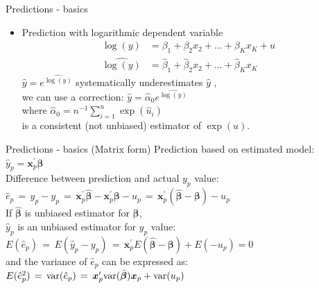 \documentclass{beamer}
\begin{document}

\begin{frame}{Predictions - basics}
\begin{itemize}
\item Prediction with logarithmic dependent variable
\begin{align}\nonumber
\log(y) &= \beta_1 + \beta_2 x_2 + \dots + \beta_K x_K + u\\\nonumber
\widehat{\log(y)} &= \hat{\beta}_1 + \hat{\beta}_2 x_2 + \dots + \hat{\beta}_K x_K 
\end{align}
$\hat{y} =e^{\widehat{\log(y)}}$ systematically underestimates $\hat{y}$ , \\
\vspace{0.3cm}
we can use a correction: $\hat{y}=\widehat{\alpha}_0 e^{\widehat{\log(y)}}$ \\
\vspace{0.3cm}
where $\widehat{\alpha}_0 = n^{-1} \sum_{i=1}^n \exp(\hat{u}_i)$ \\
\vspace{0.3cm}
is a consistent (not unbiased) estimator of $\exp{(u)}$.
\end{itemize}
\end{frame}

\begin{frame}{Predictions - basics (Matrix form)}
Prediction based on estimated model:\\
\vspace{0.3cm}
$\hat{y}_p = \bm{x}_{p}^\prime \hat{\bm{\beta}}$\\
\vspace{0.3cm}
Difference between prediction and actual $y_p$ value:\\
\vspace{0.3cm}
$\hat{e}_p \,=\, \hat{y}_p - y_p
  \,=\, \bm{x}_{p}^\prime \hat{\bm{\beta}} - \bm{x}_{p}^\prime \bm{\beta} - u_p
  \,=\, \bm{x}_{p}^\prime (\hat{\bm{\beta}} - \bm{\beta}) - u_p$\\
\vspace{0.3cm}
If $\hat{\bm{\beta}}$ is unbiased estimator for $\bm{\beta}$, \\
$\hat{y}_p$ is an unbiased estimator for $y_p$ value:\\
\vspace{0.3cm}
$E(\hat{e}_p) \,=\, E(\hat{y}_p - y_p)
   \,=\, \bm{x}_{p}^\prime E(\hat{\bm{\beta}} - \bm{\beta}) + E(-u_p) =0$\\
\vspace{0.3cm}
and the variance of $\hat{e}_p$ can be expressed as:\\
\vspace{0.3cm}
$E(\hat{e}_p^2) \,=\,\textnormal{var}(\hat{e}_p)
   \,=\, \bm{x}_{p}^\prime \textnormal{var}(\hat{\bm{\beta}})\bm{x}_{p} + \textnormal{var}(u_p) $
\end{frame}
\end{document}
